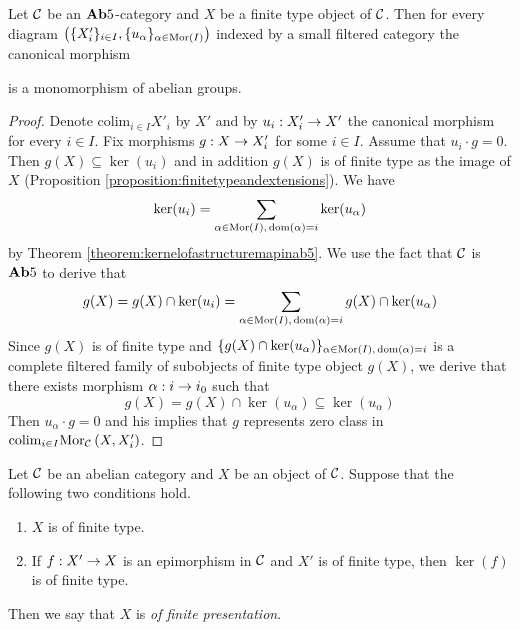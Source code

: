 \begin{proposition}\label{proposition:filteredcolimitsandfinitetype}
Let ${\mathcal C}$ be an $\mathbf{Ab}5$-category and $X$ be a finite type object of ${\mathcal C}$. Then for every diagram $\left(\{X'_i\}_{i\in I},\{u_{\alpha}\}_{\alpha \in \mathrm{Mor}(I)}\right)$ indexed by a small filtered category the canonical morphism
\begin{center}
\end{center}
is a monomorphism of abelian groups.
\end{proposition}
\begin{proof}
Denote $\mathrm{colim}_{i\in I}X'_i$ by $X'$ and by $u_i:X'_i\rightarrow X'$ the canonical morphism for every $i\in I$. Fix morphisms $g:X\rightarrow X'_{i}$ for some $i\in I$. Assume that $u_{i}\cdot g = 0$. Then $g(X)\subseteq \ker(u_{i})$ and in addition $g(X)$ is of finite type as the image of $X$ (Proposition \ref{proposition:finitetypeandextensions}). We have
$$\ker(u_{i}) = \sum_{\alpha \in \mathrm{Mor}(I),\,\mathrm{dom}(\alpha)=i}\ker(u_{\alpha})$$
by Theorem \ref{theorem:kernelofastructuremapinab5}. We use the fact that ${\mathcal C}$ is $\mathbf{Ab}5$ to derive that
$$g(X)= g(X)\cap \ker(u_{i}) = \sum_{\alpha \in \mathrm{Mor}(I),\,\mathrm{dom}(\alpha)=i}g(X)\cap \ker(u_{\alpha})$$
Since $g(X)$ is of finite type and $\{g(X)\cap \ker(u_{\alpha})\}_{\alpha \in \mathrm{Mor}(I),\,\mathrm{dom}(\alpha)=i}$ is a complete filtered family of subobjects of finite type object $g(X)$, we derive that there exists morphism $\alpha:i\rightarrow i_0$ such that 
$$g(X) = g(X)\cap \ker(u_{\alpha})\subseteq \ker(u_{\alpha})$$
Then $u_{\alpha}\cdot g = 0$ and his implies that $g$ represents zero class in $\mathrm{colim}_{i\in I}\mathrm{Mor}_{{\mathcal C}}\left(X,X'_i\right)$.
\end{proof}

\begin{definition}
Let ${\mathcal C}$ be an abelian category and $X$ be an object of ${\mathcal C}$. Suppose that the following two conditions hold.
\begin{enumerate}[label=\textbf{(\arabic*)}, leftmargin=1.5em]
\item $X$ is of finite type.
\item If $f:X'\rightarrow X$ is an epimorphism in ${\mathcal C}$ and $X'$ is of finite type, then $\ker(f)$ is of finite type.
\end{enumerate}
Then we say that $X$ is \textit{of finite presentation}.
\end{definition}

